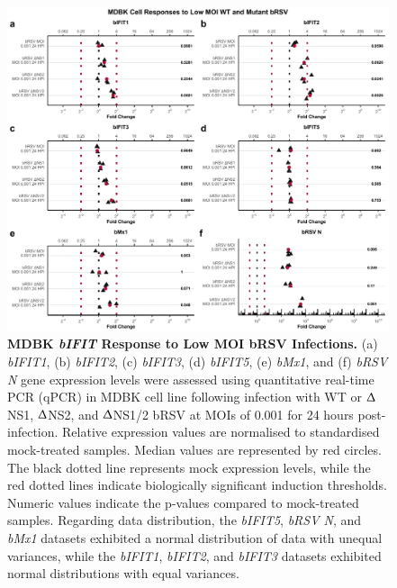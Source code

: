 \begin{figure}
    \centering
    \includegraphics[width=1\linewidth]{07. Chapter 2/Figs/02. Induction/06. mdbk_brsv_low_moi.pdf}
    \caption[MDBK \textit{bIFIT} Response to Low MOI bRSV Infections.]{\textbf{MDBK \textit{bIFIT} Response to Low MOI bRSV Infections.} (a) \textit{bIFIT1}, (b) \textit{bIFIT2}, (c) \textit{bIFIT3}, (d) \textit{bIFIT5}, (e) \textit{bMx1}, and (f) \textit{bRSV N} gene expression levels were assessed using quantitative real-time PCR (qPCR) in MDBK cell line following infection with WT or $\Updelta$NS1, $\Updelta$NS2, and $\Updelta$NS1/2 bRSV at MOIs of 0.001 for 24 hours post-infection. Relative expression values are normalised to standardised mock-treated samples. Median values are represented by red circles. The black dotted line represents mock expression levels, while the red dotted lines indicate biologically significant induction thresholds. Numeric values indicate the p-values compared to mock-treated samples. Regarding data distribution, the \textit{bIFIT5}, \textit{bRSV N}, and \textit{bMx1} datasets exhibited a normal distribution of data with unequal variances, while the \textit{bIFIT1}, \textit{bIFIT2}, and \textit{bIFIT3} datasets exhibited normal distributions with equal variances.}
    \label{fig:MDBK responses to low MOI mutant bRSV}
\end{figure}

